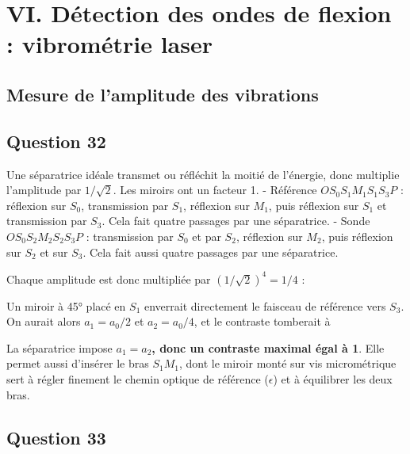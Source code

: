 \documentclass[11pt,a4paper]{article}
\newcommand{\equationajustee}[1]{%
  \sbox{\boiteequation}{$\displaystyle #1$}%
  \ifdim\wd\boiteequation>\linewidth
    \[\resizebox{\linewidth}{!}{\usebox{\boiteequation}}\]%
  \else
    \[#1\]%
  \fi}
\begin{document}
\hypertarget{vi.-duxe9tection-des-ondes-de-flexion-vibromuxe9trie-laser}{%
\section{VI. Détection des ondes de flexion : vibrométrie laser}\label{vi.-duxe9tection-des-ondes-de-flexion-vibromuxe9trie-laser}}

\hypertarget{mesure-de-lamplitude-des-vibrations}{%
\subsection{Mesure de l'amplitude des vibrations}\label{mesure-de-lamplitude-des-vibrations}}

\hypertarget{question-32}{%
\subsection{Question 32}\label{question-32}}

Une séparatrice idéale transmet ou réfléchit la moitié de l'énergie, donc multiplie l'amplitude par \(1/\sqrt2\). Les miroirs ont un facteur 1.
- Référence \(OS_0S_1M_1S_1S_3P\) : réflexion sur \(S_0\), transmission par \(S_1\), réflexion sur \(M_1\), puis réflexion sur \(S_1\) et transmission par \(S_3\). Cela fait quatre passages par une séparatrice.
- Sonde \(OS_0S_2M_2S_2S_3P\) : transmission par \(S_0\) et par \(S_2\), réflexion sur \(M_2\), puis réflexion sur \(S_2\) et sur \(S_3\). Cela fait aussi quatre passages par une séparatrice.

Chaque amplitude est donc multipliée par \((1/\sqrt2)^4=1/4\) :

\equationajustee{\boxed{a_1=a_2=\frac{a_0}{4}}}

Un miroir à 45° placé en \(S_1\) enverrait directement le faisceau de référence vers \(S_3\). On aurait alors \(a_1=a_0/2\) et \(a_2=a_0/4\), et le contraste tomberait à

\equationajustee{\frac{2a_1a_2}{a_1^2+a_2^2}=0{,}8}

La séparatrice impose \textbf{\(a_1=a_2\), donc un contraste maximal égal à 1}. Elle permet aussi d'insérer le bras \(S_1M_1\), dont le miroir monté sur vis micrométrique sert à régler finement le chemin optique de référence (\(\epsilon\)) et à équilibrer les deux bras.

\hypertarget{question-33}{%
\subsection{Question 33}\label{question-33}}
\end{document}
